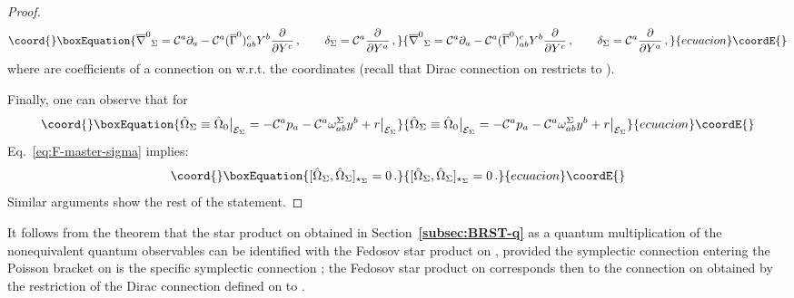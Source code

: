\documentclass[a4paper,11pt]{amsart}
\numberwithin{thm}{section} %
\numberwithin{equation}{section} %
\numberwithin{figure}{section} %
\providecommand{\bref}[1]{{\bf \ref{#1}}}
\providecommand{\commut}[2]{[#1,#2]}
\renewcommand{\:}{{\rm\, :\,}}
\def\bar{\overline}
\def\d{\partial}
\providecommand{\dl}[1]{\displaystyle\frac{{\d}}{\d #1}}
\def\cc{{\mathcal C}}
\def\manM{{\mathcal M}}
\def\E{{ \mathcal E}}
\def\con{{\bar\Gamma}}
\def\Dcon-d{{\bar\nabla}^0}
\begin{document}
\begin{proof}
\begin{equation}\coord{}\boxEquation{
{\Dcon-d}_{\Sigma}=\cc^a\d_a-\cc^a (\con^0)^c_{ab}Y^b\dl{Y^c}\,,
\qquad \delta_{\Sigma}=\cc^a \dl{Y^a}\,,
}{
{\Dcon-d}_{\Sigma}=\cc^a\d_a-\cc^a (\con^0)^c_{ab}Y^b\dl{Y^c}\,,
\qquad \delta_{\Sigma}=\cc^a \dl{Y^a}\,,
}{ecuacion}\coordE{}\end{equation}
where \myHighlight{$(\con^0)^c_{ab}$}\coordHE{} are coefficients of a connection \myHighlight{$(\con^0)^\Sigma$}\coordHE{} on
\myHighlight{$\Sigma$}\coordHE{}  w.r.t. the coordinates \coordHE{} (recall that Dirac connection
\myHighlight{$(\con^0)$}\coordHE{} on \myHighlight{$\manM$}\coordHE{} restricts to \myHighlight{$\Sigma$}\coordHE{}).

Finally, one can observe that
for
\begin{equation}\coord{}\boxEquation{
{\hat\Omega}_\Sigma\equiv{\hat\Omega_0}{\bigr|}_{\E_\Sigma}=
-\cc^ap_a-\cc^a \omega^\Sigma_{ab}y^b+r{\bigr|}_{\E_\Sigma}
  }{
{\hat\Omega}_\Sigma\equiv{\hat\Omega_0}{\bigr|}_{\E_\Sigma}=
-\cc^ap_a-\cc^a \omega^\Sigma_{ab}y^b+r{\bigr|}_{\E_\Sigma}
  }{ecuacion}\coordE{}\end{equation}
Eq.~\eqref{eq:F-master-sigma} implies:
\begin{equation}\coord{}\boxEquation{
  \commut{{\hat\Omega}_\Sigma}{{\hat\Omega}_\Sigma}_{\star_\Sigma}=0\,.
}{
  \commut{{\hat\Omega}_\Sigma}{{\hat\Omega}_\Sigma}_{\star_\Sigma}=0\,.
}{ecuacion}\coordE{}\end{equation}
Similar arguments show the rest of the statement.
\end{proof}
It follows from the theorem that the star product on \myHighlight{$\Sigma$}\coordHE{} obtained
in Section~\bref{subsec:BRST-q} as a quantum multiplication
of the nonequivalent quantum observables can be identified with
the Fedosov star product on \myHighlight{$\Sigma$}\coordHE{}, provided
the symplectic connection entering the Poisson bracket on \myHighlight{$\E$}\coordHE{}
is the specific symplectic connection \myHighlight{$\con^0$}\coordHE{}; the Fedosov star
product on \myHighlight{$\Sigma$}\coordHE{} corresponds then to the connection
\myHighlight{$(\con^0)^\Sigma$}\coordHE{} on \myHighlight{$\Sigma$}\coordHE{}
obtained by the restriction of the Dirac connection \myHighlight{$\con^0$}\coordHE{}
defined on \myHighlight{$\manM$}\coordHE{} to \myHighlight{$\Sigma$}\coordHE{}.
\end{document}
